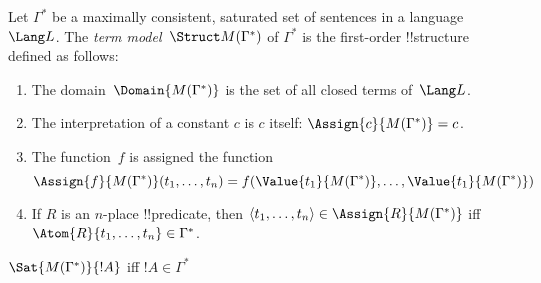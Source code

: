 \documentclass[../../include/open-logic-section]{subfiles}
\begin{document}

\begin{defn}
Let $\Gamma^*$ be a maximally consistent, saturated set of sentences
in a language~$\Lang L$.  The \emph{term model}~$\Struct M(\Gamma^*)$
of $\Gamma^*$ is the first-order !!{structure} defined as follows:
\begin{enumerate}
\item The domain~$\Domain{M(\Gamma^*)}$ is the set of all closed terms
  of~$\Lang L$.
\item The interpretation of a constant $c$ is $c$ itself:
  $\Assign{c}{M(\Gamma^*)} = c$.
\item The function~$f$ is assigned the function
\[
\Assign{f}{M(\Gamma^*)}(t_1, \dots, t_n) = f(\Value{t_1}{M(\Gamma^*)},
\dots, \Value{t_1}{M(\Gamma^*)})
\]
\item If $R$ is an $n$-place !!{predicate}, then $\langle t_1, \dots,
  t_n\rangle \in \Assign{R}{M(\Gamma^*)}$ iff $\Atom{R}{t_1, \dots,
    t_n} \in \Gamma^*$.
\end{enumerate}
\end{defn}

\begin{lem}
$\Sat{M(\Gamma^*)}{!A}$ iff $!A \in \Gamma^*$
\end{lem}
\end{document}
